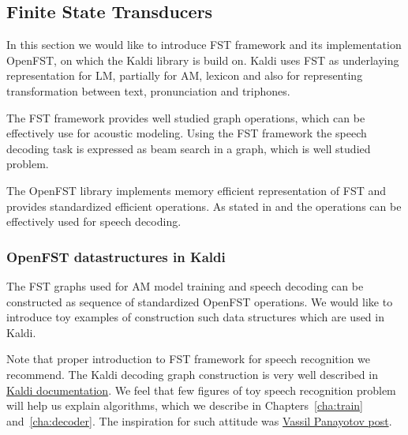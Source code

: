 \subsection{Finite State Transducers} 
\label{sec:fst}
In this section we would like to introduce \acl{FST} framework and its
implementation OpenFST, on which the Kaldi library is build on. 
Kaldi uses \ac{FST} as underlaying representation for \ac{LM}, partially for \ac{AM}, lexicon and 
also for representing transformation between text, pronunciation and triphones.

The \ac{FST} framework provides well studied graph operations\cite{mohri2002weighted},
which can be effectively use for acoustic modeling.
Using the \ac{FST} framework the speech decoding task is expressed as
beam search in a graph, which is well studied problem.

The OpenFST library implements memory efficient representation of \ac{FST} and
provides standardized efficient operations.
As stated in \cite{mohri2002weighted} and \cite{povey2011kaldi} the operations can be effectively used
for speech decoding. 

\subsubsection*{OpenFST datastructures in Kaldi}
The \ac{FST} graphs used for \ac{AM} model training and speech decoding
can be constructed as sequence of standardized OpenFST operations.
We would like to introduce toy examples of construction such data structures which are used in Kaldi.

Note that proper introduction to \ac{FST} framework for speech recognition we recommend\cite{mohri2002weighted}.
The Kaldi decoding graph construction is very well described in \href{http://kaldi.sourceforge.net/graph\_recipe\_test.html}{Kaldi documentation}.
We feel that few figures of toy speech recognition problem will help us explain algorithms,
which we describe in Chapters~\ref{cha:train} and~\ref{cha:decoder}.
The inspiration for such attitude was \href{http://vpanayotov.blogspot.cz/2012/06/kaldi-decoding-graph-construction.html}{Vassil Panayotov post}.



